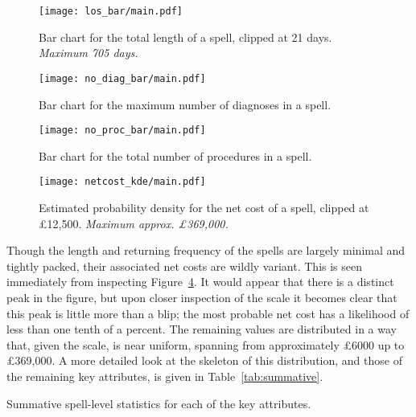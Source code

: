 \begin{figure}[htbp]
    \texttt{[image: los\_bar/main.pdf]}
    \caption{Bar chart for the total length of a spell, clipped at 21 days.
        \textit{Maximum 705 days.}}%
    \label{fig:los_bar}
\end{figure}

\begin{figure}[htbp]
    \centering
    \texttt{[image: no\_diag\_bar/main.pdf]}
    \caption{Bar chart for the maximum number of diagnoses in a spell.}%
    \label{fig:no_diag_bar}
\end{figure}

\begin{figure}[htbp]
    \centering
    \texttt{[image: no\_proc\_bar/main.pdf]}
    \caption{Bar chart for the total number of procedures in a spell.}%
    \label{fig:no_proc_bar}
\end{figure}

\begin{figure}[htbp]
    \centering
    \texttt{[image: netcost\_kde/main.pdf]}
    \caption{Estimated probability density for the net cost of a spell, clipped
        at \pounds12,500. \textit{Maximum approx. \pounds369,000.}}%
    \label{fig:netcost_kde}
\end{figure}

Though the length and returning frequency of the spells are largely minimal and
tightly packed, their associated net costs are wildly variant. This is seen
immediately from inspecting Figure~\ref{fig:netcost_kde}. It would appear that
there is a distinct peak in the figure, but upon closer inspection of the scale
it becomes clear that this peak is little more than a blip; the most probable
net cost has a likelihood of less than one tenth of a percent. The remaining
values are distributed in a way that, given the scale, is near uniform, spanning
from approximately \pounds6000 up to \pounds369,000. A more detailed look at the
skeleton of this distribution, and those of the remaining key attributes, is
given in Table~\ref{tab:summative}.

\begin{table}[htbp]
    \resizebox{\imgwidth}{!}{%
        
    }

    \vspace{5pt}

    \resizebox{\imgwidth}{!}{%
        
    }

    \vspace{5pt}
    
    \resizebox{\imgwidth}{!}{%
        
    }
    \caption{Summative spell-level statistics for each of the key attributes.}%
    \label{tab:summative}
\end{table}

